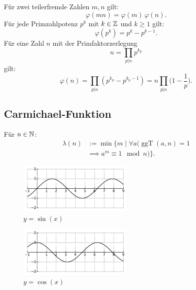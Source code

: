 \noindent
Für zwei teilerfremde Zahlen $m,n$ gilt:
\begin{equation}
\varphi(mn) = \varphi(m)\,\varphi(n).
\end{equation}
Für jede Primzahlpotenz $p^k$ mit $k\in\mathbb Z$ und $k\ge 1$ gilt:
\begin{equation}
\varphi(p^k) = p^k-p^{k-1}.
\end{equation}
Für eine Zahl $n$ mit der Primfaktorzerlegung
\begin{equation}
n=\prod_{p|n} p^{k_p}
\end{equation}
gilt:
\begin{equation}
\varphi(n) = \prod_{p|n} (p^{k_p}-p^{k_p-1})
= n\prod_{p|n} \Big(1-\frac{1}{p}\Big).
\end{equation}

\subsection{Carmichael-Funktion}
\begin{definition}\mbox{}\newline
Für $n\in\mathbb N$:
\begin{equation}
\begin{split}
\lambda(n) &:= \min\{m\mid \forall a(\operatorname{ggT}(a,n)=1\\
&\implies a^m\equiv 1\mod n)\}.
\end{split}
\end{equation}
\end{definition}

\newpage
\begin{figure}[h!]
\includegraphics[width=0.5\textwidth]{img/sin.pdf}
\caption{$y=\sin(x)$}
\end{figure}

\begin{figure}[h!]
\includegraphics[width=0.5\textwidth]{img/cos.pdf}
\caption{$y=\cos(x)$}
\end{figure}

